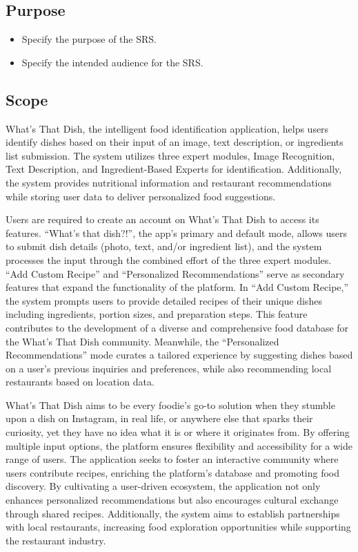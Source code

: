 \documentclass[]{article}
\begin{document}
\subsection{Purpose}
\label{sub:purpose}
\begin{itemize}
	\item Specify the purpose of the SRS.
	\item Specify the intended audience for the SRS.
\end{itemize}

\subsection{Scope}
\label{sub:scope}
What’s That Dish, the intelligent food identification application, helps users identify dishes based on their input of an image, text description, or ingredients list submission. The system utilizes three expert modules, Image Recognition, Text Description, and Ingredient-Based Experts for identification. Additionally, the system provides nutritional information and restaurant recommendations while storing user data to deliver personalized food suggestions.

Users are required to create an account on What’s That Dish to access its features. “What’s that dish?!”, the app’s primary and default mode, allows users to submit dish details (photo, text, and/or ingredient list), and the system processes the input through the combined effort of the three expert modules. “Add Custom Recipe” and “Personalized Recommendations” serve as secondary features that expand the functionality of the platform. In “Add Custom Recipe,” the system prompts users to provide detailed recipes of their unique dishes including ingredients, portion sizes, and preparation steps. This feature contributes to the development of a diverse and comprehensive food database for the What’s That Dish community. Meanwhile, the “Personalized Recommendations” mode curates a tailored experience by suggesting dishes based on a user’s previous inquiries and preferences, while also recommending local restaurants based on location data.

What’s That Dish aims to be every foodie’s go-to solution when they stumble upon a dish on Instagram, in real life, or anywhere else that sparks their curiosity, yet they have no idea what it is or where it originates from. By offering multiple input options, the platform ensures flexibility and accessibility for a wide range of users. The application seeks to foster an interactive community where users contribute recipes, enriching the platform’s database and promoting food discovery. By cultivating a user-driven ecosystem, the application not only enhances personalized recommendations but also encourages cultural exchange through shared recipes. Additionally, the system aims to establish partnerships with local restaurants, increasing food exploration opportunities while supporting the restaurant industry.
\end{document}
